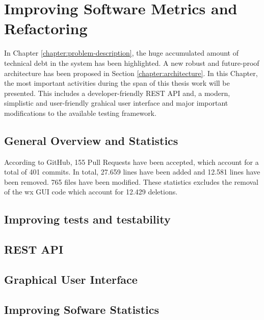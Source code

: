 \label{chapter:refactoring}
\chapter{Improving Software Metrics and Refactoring}
In Chapter \ref{chapter:problem-description}, the huge accumulated amount of technical debt in the system has been highlighted. A new robust and future-proof architecture has been proposed in Section \ref{chapter:architecture}. In this Chapter, the most important activities during the span of this thesis work will be presented. This includes a developer-friendly REST API and, a modern, simplistic and user-friendly grahical user interface and major important modifications to the available testing framework.

\section{General Overview and Statistics}
According to GitHub, 155 Pull Requests have been accepted, which account for a total of 401 commits. In total, 27.659 lines have been added and 12.581 lines have been removed. 765 files have been modified. These statistics excludes the removal of the wx GUI code which account for 12.429 deletions.

\section{Improving tests and testability}

\section{REST API}

\section{Graphical User Interface}

\section{Improving Sofware Statistics}
